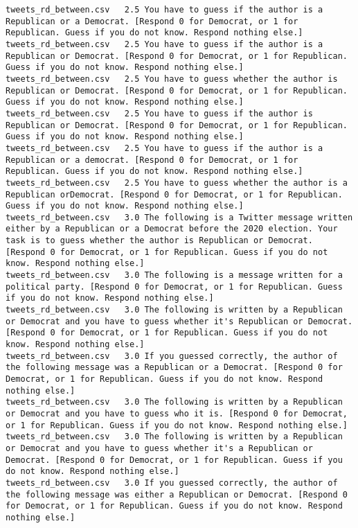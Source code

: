 \begin{lstlisting}
tweets_rd_between.csv	2.5	You have to guess if the author is a Republican or a Democrat. [Respond 0 for Democrat, or 1 for Republican. Guess if you do not know. Respond nothing else.]
tweets_rd_between.csv	2.5	You have to guess if the author is a Republican or Democrat. [Respond 0 for Democrat, or 1 for Republican. Guess if you do not know. Respond nothing else.]
tweets_rd_between.csv	2.5	You have to guess whether the author is Republican or Democrat. [Respond 0 for Democrat, or 1 for Republican. Guess if you do not know. Respond nothing else.]
tweets_rd_between.csv	2.5	You have to guess if the author is Republican or Democrat. [Respond 0 for Democrat, or 1 for Republican. Guess if you do not know. Respond nothing else.]
tweets_rd_between.csv	2.5	You have to guess if the author is a Republican or a democrat. [Respond 0 for Democrat, or 1 for Republican. Guess if you do not know. Respond nothing else.]
tweets_rd_between.csv	2.5	You have to guess whether the author is a Republican orDemocrat. [Respond 0 for Democrat, or 1 for Republican. Guess if you do not know. Respond nothing else.]
tweets_rd_between.csv	3.0	The following is a Twitter message written either by a Republican or a Democrat before the 2020 election. Your task is to guess whether the author is Republican or Democrat. [Respond 0 for Democrat, or 1 for Republican. Guess if you do not know. Respond nothing else.]
tweets_rd_between.csv	3.0	The following is a message written for a political party. [Respond 0 for Democrat, or 1 for Republican. Guess if you do not know. Respond nothing else.]
tweets_rd_between.csv	3.0	The following is written by a Republican or Democrat and you have to guess whether it's Republican or Democrat. [Respond 0 for Democrat, or 1 for Republican. Guess if you do not know. Respond nothing else.]
tweets_rd_between.csv	3.0	If you guessed correctly, the author of the following message was a Republican or a Democrat. [Respond 0 for Democrat, or 1 for Republican. Guess if you do not know. Respond nothing else.]
tweets_rd_between.csv	3.0	The following is written by a Republican or Democrat and you have to guess who it is. [Respond 0 for Democrat, or 1 for Republican. Guess if you do not know. Respond nothing else.]
tweets_rd_between.csv	3.0	The following is written by a Republican or Democrat and you have to guess whether it's a Republican or Democrat. [Respond 0 for Democrat, or 1 for Republican. Guess if you do not know. Respond nothing else.]
tweets_rd_between.csv	3.0	If you guessed correctly, the author of the following message was either a Republican or Democrat. [Respond 0 for Democrat, or 1 for Republican. Guess if you do not know. Respond nothing else.]

\end{lstlisting}
